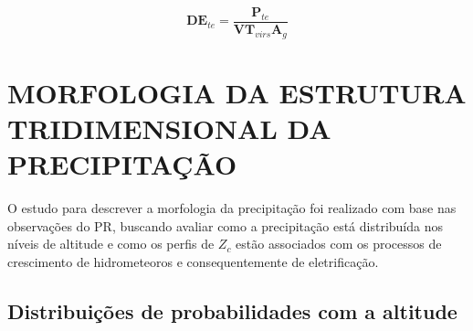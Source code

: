



\begin{equation}
\mathbf{DE}_{te} = \frac{\mathbf{P}_{te}}{\mathbf{VT}_{virs} \mathbf{A}_g}    
\label{dete}
\end{equation}

\section{MORFOLOGIA DA ESTRUTURA TRIDIMENSIONAL DA PRECIPITAÇÃO}

O estudo para descrever a morfologia da precipitação foi realizado com base nas observações do PR, buscando avaliar como a precipitação está distribuída nos níveis de altitude e como os perfis de $Z_c$ estão associados com os processos de crescimento de hidrometeoros e consequentemente de eletrificação.  

\subsection{Distribuições de probabilidades com a altitude}

